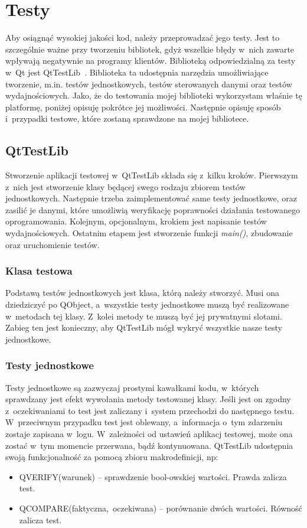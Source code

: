 \chapter{Testy}
Aby osiągnąć wysokiej jakości kod, należy przeprowadzać jego testy. Jest to szczególnie ważne przy tworzeniu bibliotek, gdyż wszelkie błędy w~nich zawarte wpływają negatywnie na programy klientów.
Biblioteką odpowiedzialną za testy w~Qt jest QtTestLib~\cite{Qt:TestLib}. Biblioteka ta udostępnia narzędzia umożliwiające tworzenie, m.in. testów jednostkowych, testów sterowanych danymi oraz testów wydajnościowych. Jako, że do testowania mojej biblioteki wykorzystam właśnie tę platformę, poniżej opisuję pokrótce jej możliwości. Następnie opisuję sposób i~przypadki testowe, które zostaną sprawdzone na mojej bibliotece.

\section{QtTestLib}
Stworzenie aplikacji testowej w~QtTestLib składa się z~kilku kroków. Pierwszym z~nich jest stworzenie klasy będącej swego rodzaju zbiorem testów jednostkowych. Następnie trzeba zaimplementować same testy jednostkowe, oraz zasilić je danymi, które umożliwią weryfikację poprawności działania testowanego oprogramowania. Kolejnym, opcjonalnym, krokiem jest napisanie testów wydajnościowych. Ostatnim etapem jest stworzenie funkcji \textit{main()}, zbudowanie oraz uruchomienie testów.

\subsection{Klasa testowa}
Podstawą testów jednostkowych jest klasa, którą należy stworzyć. Musi ona dziedziczyć po QObject, a~wszystkie testy jednostkowe muszą być realizowane w~metodach tej klasy. Z~kolei metody te muszą być jej prywatnymi slotami. Zabieg ten jest konieczny, aby QtTestLib mógł wykryć wszystkie nasze testy jednostkowe.


\subsection{Testy jednostkowe}
Testy jednostkowe są zazwyczaj prostymi kawałkami kodu, w~których sprawdzany jest efekt wywołania metody testowanej klasy. Jeśli jest on zgodny z~oczekiwaniami to test jest zaliczany i~system przechodzi do następnego testu. W~przeciwnym przypadku test jest oblewany, a~informacja o~tym zdarzeniu zostaje zapisana w~logu. W~zależności od ustawień aplikacj testowej, może ona zostać w~tym momencie przerwana, bądź kontynuowana. 
QtTestLib udostępnia swoją funkcjonalność za pomocą zbioru makrodefinicji, np:
\begin{itemize}
\item{QVERIFY(warunek) -- sprawdzenie bool-owskiej wartości. Prawda zalicza test.}
\item{QCOMPARE(faktyczna,~oczekiwana) -- porównanie dwóch wartości. Równość zalicza test.}
\end{itemize}


